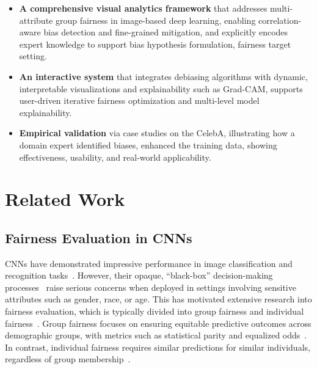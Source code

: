 \documentclass[sigconf]{acmart}
\newcommand{\REVISE}[1]{#1}
\begin{document}
\begin{itemize}[left=0pt, itemsep=0pt, parsep=0pt, topsep=0pt]
  \item \textbf{A comprehensive visual analytics framework} that addresses multi-attribute group fairness in image-based deep learning, enabling correlation-aware bias detection and fine-grained mitigation, \REVISE{and explicitly encodes expert knowledge to support bias hypothesis formulation, fairness target setting.}
  \item \textbf{An interactive system} that integrates debiasing algorithms with dynamic, interpretable visualizations and explainability such as Grad-CAM, supports user-driven iterative fairness optimization and multi-level model explainability.
  \item \textbf{Empirical validation} \REVISE{via case studies on the CelebA, illustrating how a domain expert identified biases, enhanced the training data,} showing effectiveness, usability, and real-world applicability.
\end{itemize}



\section{Related Work}

\subsection{Fairness Evaluation in CNNs}
CNNs have demonstrated impressive performance in image classification and recognition tasks~\cite{DBLP:journals/air/ZhaoWZHDP24}. However, their opaque, ``black-box'' decision-making processes~\cite{DBLP:conf/icis/WannerHHJZ20,DBLP:journals/csur/IbrahimS23} raise serious concerns when deployed in settings involving sensitive attributes such as gender, race, or age. This has motivated extensive research into fairness evaluation, which is typically divided into group fairness and individual fairness~\cite{DBLP:journals/csur/ParragaMOGKMMSB25,DBLP:journals/csur/MehrabiMSLG21}. Group fairness focuses on ensuring equitable predictive outcomes across demographic groups, with metrics such as statistical parity and equalized odds~\cite{DBLP:conf/innovations/DworkHPRZ12}. In contrast, individual fairness requires similar predictions for similar individuals, regardless of group membership~\cite{DBLP:journals/csur/MehrabiMSLG21}. 
\end{document}
